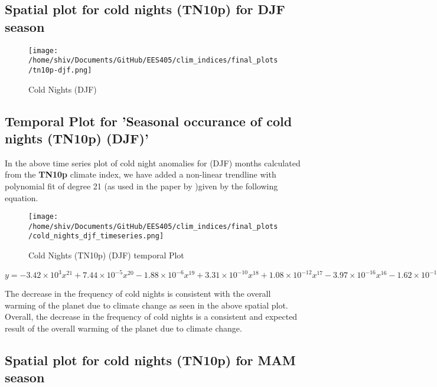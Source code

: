 \documentclass[a4paper, 12pt, twoside]{report}
\begin{document}
\subsection{Spatial plot for cold nights (TN10p) for DJF season }
\begin{figure}[htb]
    \centering
    \texttt{[image: /home/shiv/Documents/GitHub/EES405/clim\_indices/final\_plots/tn10p-djf.png]}
    \caption{Cold Nights (DJF)}
    \label{fig:cold_nights_djf}
\end{figure}


\subsection{Temporal Plot for 'Seasonal occurance of cold nights (TN10p) (DJF)'}
In the above time series plot of cold night anomalies for (DJF) months calculated from the \textbf{TN10p} climate index, we have added a non-linear trendline with polynomial fit of degree 21 (as used in the paper by )given by the following equation. \\
\begin{figure}[htb]
    \centering
    \texttt{[image: /home/shiv/Documents/GitHub/EES405/clim\_indices/final\_plots/cold\_nights\_djf\_timeseries.png]}
    \caption{Cold Nights (TN10p) (DJF) temporal Plot}
    \label{fig:tn10p_djf_temporal}
\end{figure}

$ y = -3.42\times10^{3}x^{21}+7.44\times10^{-5}x^{20}-1.88\times10^{-6}x^{19}+3.31\times10^{-10}x^{18}+1.08\times10^{-12}x^{17}-3.97\times10^{-16}x^{16}-1.62\times10^{-19}x^{15}+1.05\times10^{-22}x^{14}-5.80\times10^{-27}x^{13}-8.00\times10^{-30}x^{12}+2.29\times10^{-33}x^{11}-1.20\times10^{-37}x^{10}-6.72\times10^{-41}x^{9}+1.99\times10^{-44}x^{8}-2.95\times10^{-48}x^{7}+2.85\times10^{-52}x^{6}-1.92\times10^{-56}x^{5}+9.12\times10^{-61}x^{4}-3.03\times10^{-65}x^{3}+6.69\times10^{-70}x^{2}-8.87\times10^{-75}x+5.34\times10^{-80}$

The decrease in the frequency of cold nights is consistent with the overall warming of the planet due to climate change as seen in the above spatial plot.\\
Overall, the decrease in the frequency of cold nights is a consistent and expected result of the overall warming of the planet due to climate change.

\newpage
\subsection{Spatial plot for cold nights (TN10p) for MAM season}
\end{document}
